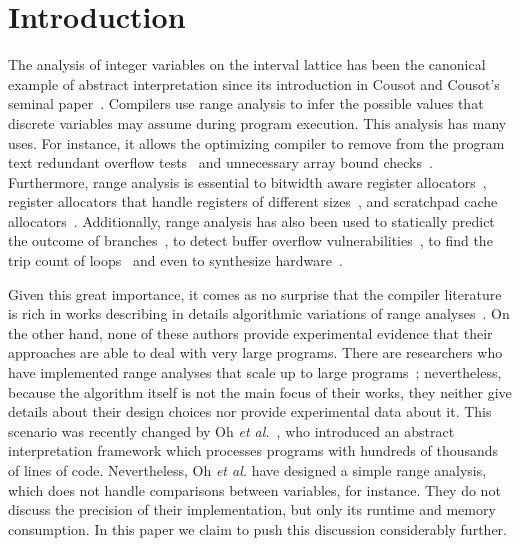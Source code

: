 \documentclass[preprint]{elsarticle}
\begin{document}
\section{Introduction}

The analysis of integer variables on the interval lattice has been the
canonical example of abstract interpretation since its introduction in
Cousot and Cousot's seminal paper~\cite{Cousot77}.
Compilers use range analysis to infer the possible values that discrete
variables may assume during program execution.
This analysis has many uses.
For instance, it allows the optimizing compiler to remove from the program text
redundant overflow tests~\cite{Sol11} and unnecessary array bound
checks~\cite{Bodik00,Gampe11}.
Furthermore, range analysis is essential to bitwidth aware register
allocators~\cite{Barik06,Tallam03}, register allocators that handle registers of
different sizes~\cite{Kong98,Pereira08,Scholz02}, and scratchpad cache
allocators~\cite{Yanqin11}.
Additionally, range analysis has also been used to statically predict the
outcome of branches~\cite{Patterson95}, to detect buffer overflow
vulnerabilities~\cite{Simon08,Wagner00}, to find the trip count of
loops~\cite{Lokuciejewski09}
and even to synthesize hardware~\cite{Cong05,Lhairech10,Mahlke01}.

Given this great importance, it comes as no surprise that the compiler
literature is rich in works describing in details algorithmic variations of
range analyses~\cite{Mahlke01,Gawlitza09,Stephenson00,Su05}.
On the other hand, none of these authors provide experimental evidence that
their approaches are able to deal with very large programs.
There are researchers who have implemented range analyses that scale up to
large programs~\cite{Patterson95,Blanchet03,Venet04}; nevertheless, because the
algorithm itself is not the main focus of their works, they neither give
details about their design choices nor provide experimental data about it.
This scenario was recently changed by Oh {\em et al.}~\cite{Oh12}, who
introduced an abstract interpretation framework which processes programs with
hundreds of thousands of lines of code.
Nevertheless, Oh {\em et al.} have designed a simple range analysis,
which does not handle comparisons between variables, for instance.
They do not discuss the precision of their implementation, but only its
runtime and memory consumption.
In this paper we claim to push this discussion considerably further.
\end{document}

